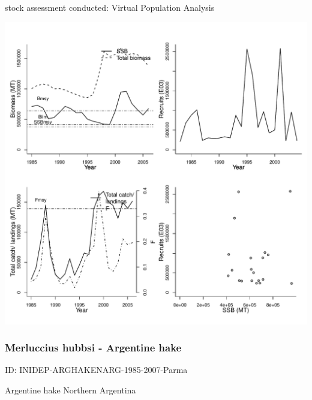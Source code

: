 stock assessment conducted: Virtual Population Analysis 
\begin{center}
\vspace{-0.2cm}\includegraphics[scale=0.65]{../tex/figures/plot-INIDEP-PATGRENADIERSARG-1983-2006-Parma.pdf}
\end{center}

\newpage
\subsubsection{Merluccius hubbsi - Argentine hake}
ID: INIDEP-ARGHAKENARG-1985-2007-Parma

Argentine hake Northern Argentina 

